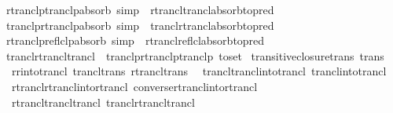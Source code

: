 \begin{isabellebody}
\isanewline
{}\isamarkupfalse%
\ rtranclp{\isacharunderscore}{\kern0pt}tranclp{\isacharunderscore}{\kern0pt}absorb\ {\isacharbrackleft}{\kern0pt}simp{\isacharbrackright}{\kern0pt}\ {\isacharequal}{\kern0pt}\ rtrancl{\isacharunderscore}{\kern0pt}trancl{\isacharunderscore}{\kern0pt}absorb{\isacharbrackleft}{\kern0pt}to{\isacharunderscore}{\kern0pt}pred{\isacharbrackright}{\kern0pt}\isanewline
{}\isamarkupfalse%
\ tranclp{\isacharunderscore}{\kern0pt}rtranclp{\isacharunderscore}{\kern0pt}absorb\ {\isacharbrackleft}{\kern0pt}simp{\isacharbrackright}{\kern0pt}\ {\isacharequal}{\kern0pt}\ trancl{\isacharunderscore}{\kern0pt}rtrancl{\isacharunderscore}{\kern0pt}absorb{\isacharbrackleft}{\kern0pt}to{\isacharunderscore}{\kern0pt}pred{\isacharbrackright}{\kern0pt}\isanewline
{}\isamarkupfalse%
\ rtranclp{\isacharunderscore}{\kern0pt}reflclp{\isacharunderscore}{\kern0pt}absorb\ {\isacharbrackleft}{\kern0pt}simp{\isacharbrackright}{\kern0pt}\ {\isacharequal}{\kern0pt}\ rtrancl{\isacharunderscore}{\kern0pt}reflcl{\isacharunderscore}{\kern0pt}absorb{\isacharbrackleft}{\kern0pt}to{\isacharunderscore}{\kern0pt}pred{\isacharbrackright}{\kern0pt}\isanewline
\isanewline
{}\isamarkupfalse%
\ trancl{\isacharunderscore}{\kern0pt}rtrancl{\isacharunderscore}{\kern0pt}trancl\ {\isacharequal}{\kern0pt}\ tranclp{\isacharunderscore}{\kern0pt}rtranclp{\isacharunderscore}{\kern0pt}tranclp\ {\isacharbrackleft}{\kern0pt}to{\isacharunderscore}{\kern0pt}set{\isacharbrackright}{\kern0pt}\isanewline
\isanewline
{}\isamarkupfalse%
\ transitive{\isacharunderscore}{\kern0pt}closure{\isacharunderscore}{\kern0pt}trans\ {\isacharbrackleft}{\kern0pt}trans{\isacharbrackright}{\kern0pt}\ {\isacharequal}{\kern0pt}\isanewline
\ \ r{\isacharunderscore}{\kern0pt}r{\isacharunderscore}{\kern0pt}into{\isacharunderscore}{\kern0pt}trancl\ trancl{\isacharunderscore}{\kern0pt}trans\ rtrancl{\isacharunderscore}{\kern0pt}trans\isanewline
\ \ trancl{\isachardot}{\kern0pt}trancl{\isacharunderscore}{\kern0pt}into{\isacharunderscore}{\kern0pt}trancl\ trancl{\isacharunderscore}{\kern0pt}into{\isacharunderscore}{\kern0pt}trancl{}\isanewline
\ \ rtrancl{\isachardot}{\kern0pt}rtrancl{\isacharunderscore}{\kern0pt}into{\isacharunderscore}{\kern0pt}rtrancl\ converse{\isacharunderscore}{\kern0pt}rtrancl{\isacharunderscore}{\kern0pt}into{\isacharunderscore}{\kern0pt}rtrancl\isanewline
\ \ rtrancl{\isacharunderscore}{\kern0pt}trancl{\isacharunderscore}{\kern0pt}trancl\ trancl{\isacharunderscore}{\kern0pt}rtrancl{\isacharunderscore}{\kern0pt}trancl\isanewline

\end{isabellebody}
